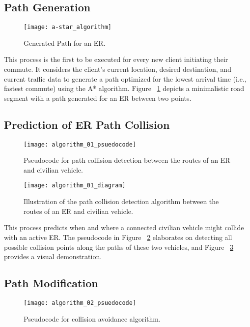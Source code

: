 	\subsection{Path Generation}
		\begin{figure}
			\texttt{[image: a-star\_algorithm]}
			\caption{Generated Path for an ER.}
			\label{fig:a-star_algorithm}
		\end{figure}
	
		
		This process is the first to be executed for every new client initiating their commute. It considers the client's current location, desired destination, and current traffic data to generate a path optimized for the lowest arrival time (i.e., fastest commute) using the A* algorithm. Figure ~\ref{fig:a-star_algorithm} depicts a minimalistic road segment with a path generated for an ER between two points.
		
	\subsection{Prediction of ER Path Collision}
		\begin{figure}
			\texttt{[image: algorithm\_01\_psuedocode]}
			\caption{Pseudocode for path collision detection between the routes of an \acrshort{ER} and civilian vehicle.}
			\label{fig:algorithm_01_psuedocode}
		\end{figure}
		
		\begin{figure}
			\texttt{[image: algorithm\_01\_diagram]}
			\caption{Illustration of the path collision detection algorithm between the routes of an \acrshort{ER} and civilian vehicle.}
			\label{fig:algorithm_01_diagram}
		\end{figure}
	
		This process predicts when and where a connected civilian vehicle might collide with an active ER. The pseudocode in Figure ~\ref{fig:algorithm_01_psuedocode} elaborates on detecting all possible collision points along the paths of these two vehicles, and Figure ~\ref{fig:algorithm_01_diagram} provides a visual demonstration.
	
	\subsection{Path Modification}
		\begin{figure}
			\texttt{[image: algorithm\_02\_psuedocode]}
			\caption{Pseudocode for collision avoidance algorithm.}
			\label{fig:algorithm_02_psuedocode}
		\end{figure}
		
